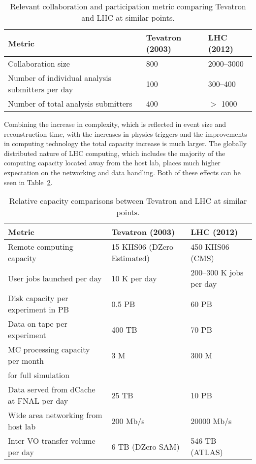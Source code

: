 \begin{table}[t]
\begin{center}
\begin{tabular}{lll}
Metric & Tevatron (2003) & LHC (2012) \\ \hline
Collaboration size & 800 & 2000--3000 \\
Number of individual analysis submitters per day & 100 & 300--400 \\
Number of total analysis submitters & 400 & $>$ 1000 \\ \hline
\end{tabular}
\caption{Relevant collaboration and participation metric comparing Tevatron and LHC at similar points.}
\label{tab:compare_coll}
\end{center}
\end{table}

Combining the increase in complexity, which is reflected in event size
and reconstruction time, with the increases in physics triggers and
the improvements in computing technology the total capacity increase
is much larger.  The globally distributed nature of LHC computing,
which includes the majority of the computing capacity located away
from the host lab, places much higher expectation on the networking
and data handling.  Both of these effects can be seen in
Table~\ref{tab:compare_comp}.

\begin{table}[t]
\begin{center}
\begin{tabular}{lll}
Metric & Tevatron (2003) & LHC (2012) \\ \hline
Remote computing capacity & 15 KHS06 (DZero Estimated) & 450 KHS06 (CMS) \\
User jobs launched per day & 10 K per day & 200--300 K jobs per day \\
Disk capacity per experiment in PB & 0.5 PB & 60 PB \\
Data on tape per experiment  & 400 TB & 70 PB \\
MC processing capacity per month & 3 M & 300 M \\
\qquad for full simulation &\\
Data served from dCache at FNAL per day & 25 TB & 10 PB \\
Wide area networking from host lab & 200 Mb/s & 20000 Mb/s \\
Inter VO transfer volume per day & 6 TB (DZero SAM) & 546 TB (ATLAS) \\ \hline
\end{tabular}
\caption{Relative capacity comparisons between Tevatron and LHC at similar points.}
\label{tab:compare_comp}
\end{center}
\end{table}


